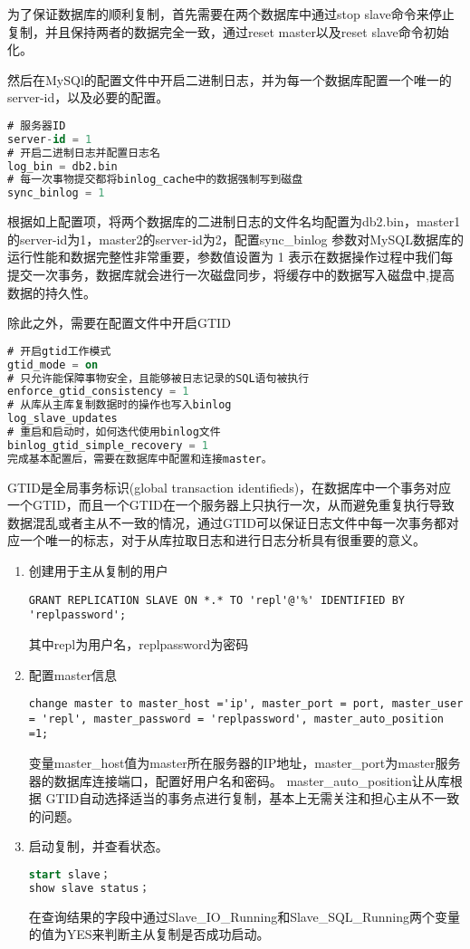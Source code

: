 为了保证数据库的顺利复制，首先需要在两个数据库中通过stop slave命令来停止复制，并且保持两者的数据完全一致，通过reset master以及reset slave命令初始化。

然后在MySQl的配置文件中开启二进制日志，并为每一个数据库配置一个唯一的server-id，以及必要的配置。
\begin{lstlisting}[language=sql,numbers=none]
# 服务器ID
server-id = 1
# 开启二进制日志并配置日志名
log_bin = db2.bin
# 每一次事物提交都将binlog_cache中的数据强制写到磁盘
sync_binlog = 1
\end{lstlisting}
根据如上配置项，将两个数据库的二进制日志的文件名均配置为db2.bin，master1的server-id为1，master2的server-id为2，配置sync\_binlog 参数对MySQL数据库的运行性能和数据完整性非常重要，参数值设置为 1 表示在数据操作过程中我们每提交一次事务，数据库就会进行一次磁盘同步，将缓存中的数据写入磁盘中,提高数据的持久性。

除此之外，需要在配置文件中开启GTID
\begin{lstlisting}[language=sql,numbers=none]
# 开启gtid工作模式
gtid_mode = on
# 只允许能保障事物安全，且能够被日志记录的SQL语句被执行
enforce_gtid_consistency = 1
# 从库从主库复制数据时的操作也写入binlog
log_slave_updates
# 重启和启动时，如何迭代使用binlog文件
binlog_gtid_simple_recovery = 1
完成基本配置后，需要在数据库中配置和连接master。
\end{lstlisting}
GTID是全局事务标识(global transaction identifieds)，在数据库中一个事务对应一个GTID，而且一个GTID在一个服务器上只执行一次，从而避免重复执行导致数据混乱或者主从不一致的情况，通过GTID可以保证日志文件中每一次事务都对应一个唯一的标志，对于从库拉取日志和进行日志分析具有很重要的意义。
\begin{enumerate}
\item 创建用于主从复制的用户
\begin{lstlisting}[numbers=none]
GRANT REPLICATION SLAVE ON *.* TO 'repl'@'%' IDENTIFIED BY 'replpassword';
\end{lstlisting}
其中repl为用户名，replpassword为密码
\item 配置master信息
\begin{lstlisting}[numbers=none]
change master to master_host ='ip', master_port = port, master_user = 'repl', master_password = 'replpassword', master_auto_position =1;
\end{lstlisting}
变量master\_host值为master所在服务器的IP地址，master\_port为master服务器的数据库连接端口，配置好用户名和密码。
master\_auto\_position让从库根据 GTID自动选择适当的事务点进行复制，基本上无需关注和担心主从不一致的问题。
\item 启动复制，并查看状态。
\begin{lstlisting}[language=sql,numbers=none]
start slave；
show slave status；
\end{lstlisting}
在查询结果的字段中通过Slave\_IO\_Running和Slave\_SQL\_Running两个变量的值为YES来判断主从复制是否成功启动。
\end{enumerate}


